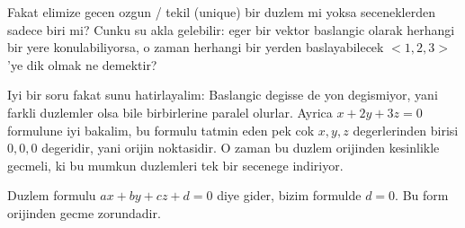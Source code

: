 \documentclass[12pt,fleqn]{article}
\begin{document}
Fakat elimize gecen ozgun / tekil (unique) bir duzlem mi yoksa
seceneklerden sadece biri mi? Cunku su akla gelebilir: eger bir vektor
baslangic olarak herhangi bir yere konulabiliyorsa, o zaman herhangi bir
yerden baslayabilecek $<1,2,3>$'ye dik olmak ne demektir? 

Iyi bir soru fakat sunu hatirlayalim: Baslangic degisse de yon degismiyor,
yani farkli duzlemler olsa bile birbirlerine paralel olurlar. Ayrica $x +
2y + 3z = 0$ 
formulune iyi bakalim, bu formulu tatmin eden pek cok $x,y,z$
degerlerinden birisi $0,0,0$ degeridir, yani orijin noktasidir. O zaman bu duzlem
orijinden kesinlikle gecmeli, ki bu mumkun duzlemleri tek bir secenege
indiriyor. 

Duzlem formulu $ax + by + cz + d= 0$ diye gider, bizim formulde $d=0$. Bu
form orijinden gecme zorundadir.
\end{document}
